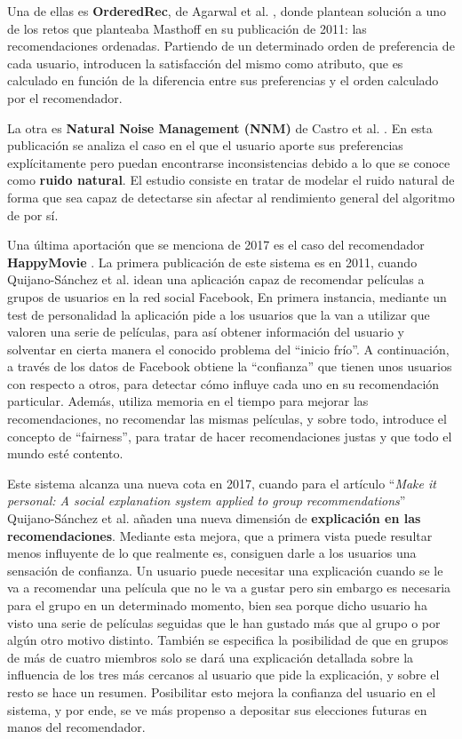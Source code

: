 Una de ellas es \textbf{OrderedRec}, de Agarwal et al. \cite{orderedrec}, donde plantean solución a uno de los retos que planteaba Masthoff en su publicación de 2011: las recomendaciones ordenadas. Partiendo de un determinado orden de preferencia de cada usuario, introducen la satisfacción del mismo como atributo, que es calculado en función de la diferencia entre sus preferencias y el orden calculado por el recomendador.

La otra es \textbf{Natural Noise Management (NNM)} de Castro et al. \cite{nnm}. En esta publicación se analiza el caso en el que el usuario aporte sus preferencias explícitamente pero puedan encontrarse inconsistencias debido a lo que se conoce como \textbf{ruido natural}. El estudio consiste en tratar de modelar el ruido natural de forma que sea capaz de detectarse sin afectar al rendimiento general del algoritmo de por sí.

Una última aportación que se menciona de 2017 es el caso del recomendador \textbf{HappyMovie} \cite{happymovie2011}. La primera publicación de este sistema es en 2011, cuando Quijano-Sánchez et al. idean una aplicación capaz de recomendar películas a grupos de usuarios en la red social Facebook, En primera instancia, mediante un test de personalidad la aplicación pide a los usuarios que la van a utilizar que valoren una serie de películas, para así obtener información del usuario y solventar en cierta manera el conocido problema del ``inicio frío''. A continuación, a través de los datos de Facebook obtiene la ``confianza'' que tienen unos usuarios con respecto a otros, para detectar cómo influye cada uno en su recomendación particular. Además, utiliza memoria en el tiempo para mejorar las recomendaciones, no recomendar las mismas películas, y sobre todo, introduce el concepto de ``fairness'', para tratar de hacer recomendaciones justas y que todo el mundo esté contento.

Este sistema alcanza una nueva cota en 2017, cuando para el artículo ``\textit{Make it personal: A social explanation system applied to group recommendations}'' \cite{happymovie2017} Quijano-Sánchez et al. añaden una nueva dimensión de \textbf{explicación en las recomendaciones}. Mediante esta mejora, que a primera vista puede resultar menos influyente de lo que realmente es, consiguen darle a los usuarios una sensación de confianza. Un usuario puede necesitar una explicación cuando se le va a recomendar una película que no le va a gustar pero sin embargo es necesaria para el grupo en un determinado momento, bien sea porque dicho usuario ha visto una serie de películas seguidas que le han gustado más que al grupo o por algún otro motivo distinto. También se especifica la posibilidad de que en grupos de más de cuatro miembros solo se dará una explicación detallada sobre la influencia de los tres más cercanos al usuario que pide la explicación, y sobre el resto se hace un resumen. Posibilitar esto mejora la confianza del usuario en el sistema, y por ende, se ve más propenso a depositar sus elecciones futuras en manos del recomendador.

